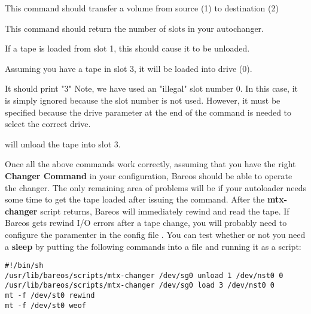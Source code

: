 
This command should transfer a volume from source (1) to destination (2)


This command should return the number of slots in your autochanger.


   If a tape is loaded from slot 1, this should cause it to be unloaded.


Assuming you have a tape in slot 3,  it will be loaded into drive (0).



It should print "3"
Note, we have used an "illegal" slot number 0. In this case, it is simply
ignored because the slot number is not used.  However, it must be specified
because the drive parameter at the end of the command is needed to select
the correct drive.


will unload the tape into slot 3.


Once all the above commands work correctly, assuming that you have the right
{\bf Changer Command} in your configuration, Bareos should be able to operate
the changer. The only remaining area of problems will be if your autoloader
needs some time to get the tape loaded after issuing the command. After the
{\bf mtx-changer} script returns, Bareos will immediately rewind and read the
tape. If Bareos gets rewind I/O errors after a tape change, you will probably
need to configure the  paramenter in the config file .
You can test whether or not you need a {\bf sleep} by putting the following
commands into a file and running it as a script:

\footnotesize
\begin{verbatim}
#!/bin/sh
/usr/lib/bareos/scripts/mtx-changer /dev/sg0 unload 1 /dev/nst0 0
/usr/lib/bareos/scripts/mtx-changer /dev/sg0 load 3 /dev/nst0 0
mt -f /dev/st0 rewind
mt -f /dev/st0 weof
\end{verbatim}
\normalsize

